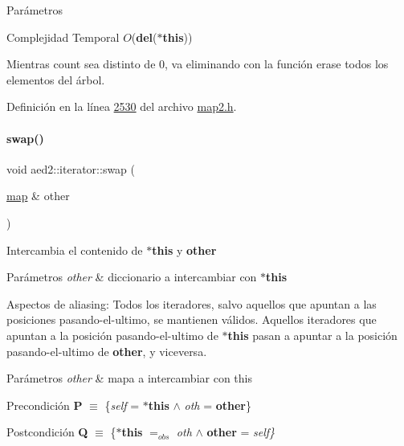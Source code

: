 \begin{DoxyParams}{\-Parámetros}
\begin{DoxyCompactItemize}
\begin{DoxyDescription}
\item[Complejidad Temporal]$O$({\bfseries del}({\bfseries $\ast$this}))
\end{DoxyDescription}Mientras count sea distinto de 0, va eliminando con la función erase todos los elementos del árbol. 

Definición en la línea \hyperlink{map2_8h_source_l02530}{2530} del archivo \hyperlink{map2_8h_source}{map2.\+h}.

\mbox{\label{classaed2_1_1iterator_a8ec2215b2dfaf6ddd57b1e0b00d8d3d2_a8ec2215b2dfaf6ddd57b1e0b00d8d3d2}} 
\paragraph{\texorpdfstring{swap()}{swap()}}
{\footnotesize\ttfamily void aed2\+::iterator\+::swap (\begin{DoxyParamCaption}\item[{\hyperlink{classaed2_1_1map}{map} \&}]{other }\end{DoxyParamCaption})\hspace{0.3cm}{\ttfamily [inline]}}



Intercambia el contenido de {\bfseries $\ast$this} y {\bfseries other} 


\begin{DoxyParams}{Parámetros}
{\em other} & diccionario a intercambiar con {\bfseries $\ast$this}\\
\hline
\end{DoxyParams}
\begin{DoxyParagraph}{Aspectos de aliasing\+:}
Todos los iteradores, salvo aquellos que apuntan a las posiciones pasando-\/el-\/ultimo, se mantienen válidos. Aquellos iteradores que apuntan a la posición pasando-\/el-\/ultimo de {\bfseries $\ast$this} pasan a apuntar a la posición pasando-\/el-\/ultimo de {\bfseries other}, y viceversa.
\end{DoxyParagraph}

\begin{DoxyParams}{Parámetros}
{\em other} & mapa a intercambiar con this\\
\hline
\end{DoxyParams}
\begin{DoxyPrecond}{Precondición}
{\bfseries P} $\equiv$ \{{\itshape self} = {\bfseries $\ast$this} $\land$ {\itshape oth} = {\bfseries other}\} 
\end{DoxyPrecond}
\begin{DoxyPostcond}{Postcondición}
{\bfseries Q} $\equiv$ \{{\bfseries $\ast$this} $=_{obs}$ {\itshape oth} $\land$ {\bfseries other} = {\itshape self\}} 
\end{DoxyPostcond}


\end{DoxyCompactItemize}
\end{DoxyParams}
